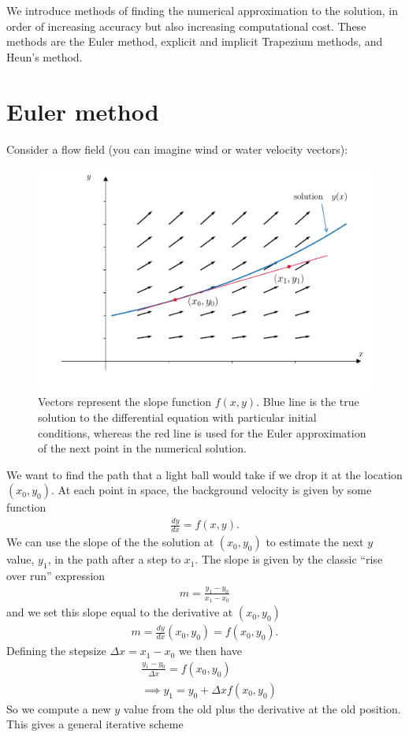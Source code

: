 We introduce methods of finding the numerical approximation to the solution, in order of increasing accuracy but also increasing computational cost. These methods are the Euler method, explicit and implicit Trapezium methods, and Heun's method.


\section{Euler method}
Consider a flow field (you can imagine wind or water velocity vectors):
\begin{figure}[H]
	\begin{center}
	\includegraphics[width=\textwidth]{figures/ch6_idea.pdf} 
	  \caption{Vectors represent the slope function $f(x,y)$. Blue line is the true solution to the differential equation with particular initial conditions, whereas the red line is used for the Euler approximation of the next point in the numerical solution.} \label{fig:ch6_idea}
	\end{center}
\end{figure}

\noindent We want to find the path that a light ball would take if we drop it at the location $(x_0,y_0)$. At each point in space, the background velocity is given by some function
\begin{align*}
\frac{dy}{dx} = f(x,y).
\end{align*}
We can use the slope of the the solution at $(x_0,y_0)$ to estimate the next $y$ value, $y_1$, in the path after a step to $x_1$. The slope is given by the classic ``rise over run'' expression
\begin{align*}
m = \frac{y_1 - y_0}{x_1 - x_0}
\end{align*}
and we set this slope equal to the derivative at $(x_0,y_0)$
\begin{align*}
m = \frac{dy}{dx}(x_0,y_0) = f(x_0,y_0).
\end{align*}
Defining the stepsize $\Delta x = x_1 - x_0$ we then have
\begin{align*}
& \frac{y_1 - y_0}{\Delta x} = f(x_0,y_0) \\
& \implies y_1 = y_0 + \Delta x f(x_0,y_0)
\end{align*}
So we compute a new $y$ value from the old plus the derivative at the old position. This gives a general iterative scheme

